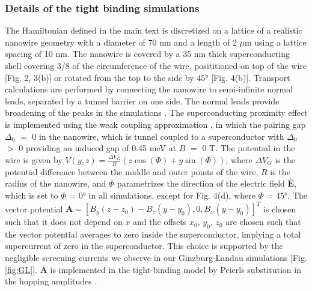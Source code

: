 \subsubsection{Details of the tight binding simulations}
The Hamiltonian defined in the main text is discretized on a lattice of a realistic nanowire geometry with a diameter of 70 nm and a length of 2 $\mu$m using a lattice spacing of 10 nm. The nanowire is covered by a 35 nm thick superconducting shell covering 3/8 of the circumference of the wire, posititioned on top of the wire [Fig. 2, 3(b)] or rotated from the top to the side by \ang{45} [Fig. 4(b)]. Transport calculations are performed by connecting the nanowire to semi-infinite normal leads, separated by a tunnel barrier on one side. The normal leads provide broadening of the peaks in the simulations \cite{Liu2017,Danon2017}. The superconducting proximity effect is implemented using the weak coupling approximation \cite{Nijholt2016}, in which the pairing gap $\Delta_0$ $=$ 0 in the nanowire, which is tunnel coupled to a superconductor with $\Delta_0$ $>$ 0 providing an induced gap of 0.45 meV at $B$ $=$ 0 T. The potential in the wire is given by $V(y,z)= \frac{\Delta V_G}{R} (z\cos(\Phi)+y\sin(\Phi))$, where $\Delta V_G$ is the potential difference between the middle and outer points of the wire, $R$ is the radius of the nanowire, and $\Phi$ parametrizes the direction of the electric field $\mathbf{\hat{E}}$, which is set to $\Phi$ = \ang{0} in all simulations, except for Fig. 4(d), where $\Phi$ = \ang{45}. The vector potential $\mathbf{A} = \left[B_y(z-z_0)-B_z(y-y_0),0,B_x(y-y_0)\right]^T$ is chosen such that it does not depend on $x$ and the offsets $x_0$, $y_0$, $z_0$ are chosen such that the vector potential averages to zero inside the superconductor, implying a total supercurrent of zero in the superconductor. This choice is supported by the negligible screening currents we observe in our Ginzburg-Landau simulations [Fig. \ref{fig:GL}]. $\mathbf{A}$ is implemented in the tight-binding model by Peierls substitution in the hopping amplitudes \cite{Hofstader1976}.

